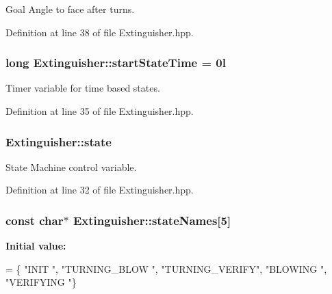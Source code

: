 Goal Angle to face after turns. 



Definition at line 38 of file Extinguisher.\-hpp.

\hypertarget{classExtinguisher_a75020779b6ba6fcd9ac11148a378d441}{
\subsubsection[{start\-State\-Time}]{\setlength{\rightskip}{0pt plus 5cm}long Extinguisher\-::start\-State\-Time = 0l\hspace{0.3cm}{\ttfamily [private]}}}\label{classExtinguisher_a75020779b6ba6fcd9ac11148a378d441}


Timer variable for time based states. 



Definition at line 35 of file Extinguisher.\-hpp.

\hypertarget{classExtinguisher_aa67c13dc091e5dc2c054d53f7fcae69b}{
\subsubsection[{state}]{ Extinguisher\-::state\hspace{0.3cm}{\ttfamily [private]}}}\label{classExtinguisher_aa67c13dc091e5dc2c054d53f7fcae69b}


State Machine control variable. 



Definition at line 32 of file Extinguisher.\-hpp.

\hypertarget{classExtinguisher_a91cd54af9125620a68939ccdc5796c66}{
\subsubsection[{state\-Names}]{\setlength{\rightskip}{0pt plus 5cm}const char$\ast$ Extinguisher\-::state\-Names\mbox{[}5\mbox{]}\hspace{0.3cm}{\ttfamily [private]}}}\label{classExtinguisher_a91cd54af9125620a68939ccdc5796c66}
{\bfseries Initial value\-:}
\begin{DoxyCode}
= \{
      \textcolor{stringliteral}{"INIT          "},
      \textcolor{stringliteral}{"TURNING\_BLOW  "},
      \textcolor{stringliteral}{"TURNING\_VERIFY"},
      \textcolor{stringliteral}{"BLOWING       "},
      \textcolor{stringliteral}{"VERIFYING     "}\}
\end{DoxyCode}


